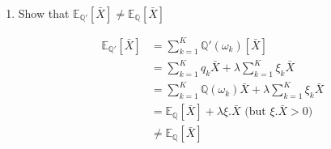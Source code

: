 \documentclass[answers]{exam}
\begin{document}
\begin{parts}
\begin{enumerate}
		\item 
		Show that $\mathbb{E}_\mathbb{Q'}[\bar{X}] \neq \mathbb{E}_\mathbb{Q}[\bar{X}]$
		
		
		\begin{solution}
			
			\begin{align*}
			\mathbb{E}_\mathbb{Q'}[\bar{X}]
			&=\sum_{k=1}^{K}\mathbb{Q'}(\omega_{k})[\bar{X}]\\
			&=\sum_{k=1}^{K}q_k\bar{X} + \lambda \sum_{k=1}^{K} \xi_k \bar{X}  \\
			&=\sum_{k=1}^{K}\mathbb{Q}(\omega_{k})\bar{X} + \lambda \sum_{k=1}^{K} \xi_k \bar{X}  \\
			&=\mathbb{E}_\mathbb{Q}[\bar{X}] + \lambda \xi. \bar{X} \text{ (but } \xi. \bar{X} >0 )\\
			&\neq \mathbb{E}_\mathbb{Q}[\bar{X}] 
			\end{align*}
			
		\end{solution}
		
	\end{enumerate}
\end{parts}
\end{document}
